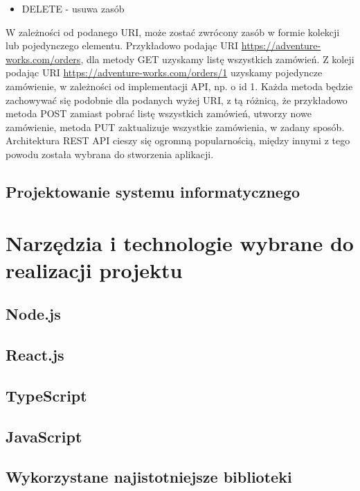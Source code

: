\documentclass[12pt]{article}
\begin{document}
\begin{sloppypar}
{{\begin{itemize}
    \item DELETE - usuwa zasób
  \end{itemize}
  W zależności od podanego URI, może zostać zwrócony zasób w formie kolekcji lub pojedynczego elementu. 
  Przykładowo podając URI \url{https://adventure-works.com/orders}, dla metody GET uzyskamy listę wszystkich zamówień. 
  Z koleji podając URI \url{https://adventure-works.com/orders/1} uzyskamy pojedyncze zamówienie, w zależności od implementacji API, np. o id 1.
  Każda metoda będzie zachowywać się podobnie dla podanych wyżej URI, z tą różnicą, że przykładowo metoda POST zamiast pobrać listę wszystkich zamówień, utworzy nowe zamówienie, 
  metoda PUT zaktualizuje wszystkie zamówienia, w zadany sposób. \\
  Architektura REST API cieszy się ogromną popularnością, między innymi z tego powodu została wybrana do stworzenia aplikacji.
}
\subsection{Projektowanie systemu informatycznego}
{

}
}

\section{Narzędzia i technologie wybrane do realizacji projektu}
{
\subsection{Node.js}
{

}
\subsection{React.js}
{

}
\subsection{TypeScript}
{

}
\subsection{JavaScript}
{

}
\subsection{Wykorzystane najistotniejsze biblioteki}
{

}}
\end{sloppypar}
\end{document}
